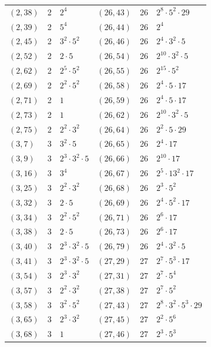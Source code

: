 \documentclass[11pt]{article}
\begin{document}
\begin{longtable}{@{}lrl@{\qquad}lrl@{}}
$(2,38)$ & 2 & $2^{4}$ & $(26,43)$ & 26 & $2^{8}\cdot 5^{2}\cdot 29$\\
$(2,39)$ & 2 & $5^{4}$ & $(26,44)$ & 26 & $2^{4}$\\
$(2,45)$ & 2 & $3^{2}\cdot 5^{2}$ & $(26,46)$ & 26 & $2^{4}\cdot 3^{2}\cdot 5$\\
$(2,52)$ & 2 & $2\cdot 5$ & $(26,54)$ & 26 & $2^{10}\cdot 3^{2}\cdot 5$\\
$(2,62)$ & 2 & $2^{5}\cdot 5^{2}$ & $(26,55)$ & 26 & $2^{15}\cdot 5^{2}$\\
$(2,69)$ & 2 & $2^{2}\cdot 5^{2}$ & $(26,58)$ & 26 & $2^{4}\cdot 5\cdot 17$\\
$(2,71)$ & 2 & $1$ & $(26,59)$ & 26 & $2^{4}\cdot 5\cdot 17$\\
$(2,73)$ & 2 & $1$ & $(26,62)$ & 26 & $2^{10}\cdot 3^{2}\cdot 5$\\
$(2,75)$ & 2 & $2^{2}\cdot 3^{2}$ & $(26,64)$ & 26 & $2^{2}\cdot 5\cdot 29$\\
$(3,7)$ & 3 & $3^{2}\cdot 5$ & $(26,65)$ & 26 & $2^{4}\cdot 17$\\
$(3,9)$ & 3 & $2^{3}\cdot 3^{2}\cdot 5$ & $(26,66)$ & 26 & $2^{10}\cdot 17$\\
$(3,16)$ & 3 & $3^{4}$ & $(26,67)$ & 26 & $2^{5}\cdot 13^{2}\cdot 17$\\
$(3,25)$ & 3 & $2^{2}\cdot 3^{2}$ & $(26,68)$ & 26 & $2^{3}\cdot 5^{2}$\\
$(3,32)$ & 3 & $2\cdot 5$ & $(26,69)$ & 26 & $2^{4}\cdot 5^{2}\cdot 17$\\
$(3,34)$ & 3 & $2^{2}\cdot 5^{2}$ & $(26,71)$ & 26 & $2^{6}\cdot 17$\\
$(3,38)$ & 3 & $2\cdot 5$ & $(26,73)$ & 26 & $2^{6}\cdot 17$\\
$(3,40)$ & 3 & $2^{3}\cdot 3^{2}\cdot 5$ & $(26,79)$ & 26 & $2^{4}\cdot 3^{2}\cdot 5$\\
$(3,41)$ & 3 & $2^{3}\cdot 3^{2}\cdot 5$ & $(27,29)$ & 27 & $2^{7}\cdot 5^{3}\cdot 17$\\
$(3,54)$ & 3 & $2^{3}\cdot 3^{2}$ & $(27,31)$ & 27 & $2^{7}\cdot 5^{4}$\\
$(3,57)$ & 3 & $2^{2}\cdot 3^{2}$ & $(27,38)$ & 27 & $2^{7}\cdot 5^{2}$\\
$(3,58)$ & 3 & $3^{2}\cdot 5^{2}$ & $(27,43)$ & 27 & $2^{8}\cdot 3^{2}\cdot 5^{3}\cdot 29$\\
$(3,65)$ & 3 & $2^{3}\cdot 3^{2}$ & $(27,45)$ & 27 & $2^{2}\cdot 5^{6}$\\
$(3,68)$ & 3 & $1$ & $(27,46)$ & 27 & $2^{3}\cdot 5^{3}$\\

\end{longtable}
\end{document}
